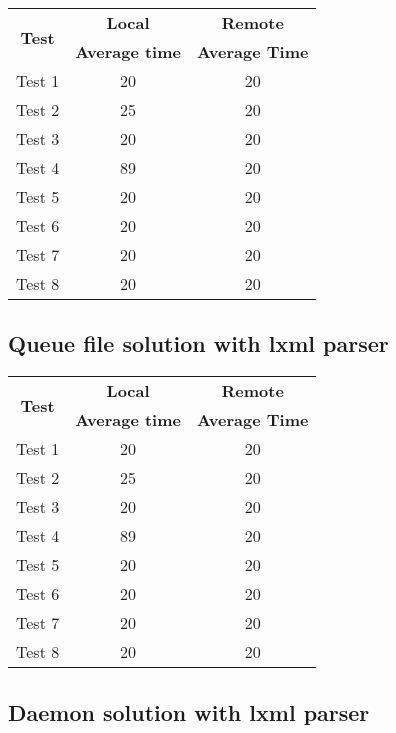 \shorthandoff{-}
\begin{center}
    \begin{tabular}{| c | c | c |}
    \hline
    \multirow{2}{*}{\textbf{Test}} & \textbf{Local} & \textbf{Remote} \\ \cline{2-3}
    & \textbf{Average time} & \textbf{Average Time} \\ \hline
    Test 1 & 20 & 20 \\ \hline
    Test 2 & 25 & 20  \\ \hline
    Test 3 & 20 & 20 \\ \hline
    Test 4 & 89 & 20 \\ \hline
    Test 5 & 20 & 20 \\ \hline
    Test 6 & 20 & 20 \\ \hline
    Test 7 & 20 & 20 \\ \hline
    Test 8 & 20 & 20 \\ \hline
    \end{tabular}
\end{center}
\shorthandon{-}

\subsection{Queue file solution with lxml parser}

\shorthandoff{-}
\begin{center}
    \begin{tabular}{| c | c | c |}
    \hline
    \multirow{2}{*}{\textbf{Test}} & \textbf{Local} & \textbf{Remote} \\ \cline{2-3}
    & \textbf{Average time} & \textbf{Average Time} \\ \hline
    Test 1 & 20 & 20 \\ \hline
    Test 2 & 25 & 20  \\ \hline
    Test 3 & 20 & 20 \\ \hline
    Test 4 & 89 & 20 \\ \hline
    Test 5 & 20 & 20 \\ \hline
    Test 6 & 20 & 20 \\ \hline
    Test 7 & 20 & 20 \\ \hline
    Test 8 & 20 & 20 \\ \hline
    \end{tabular}
\end{center}
\shorthandon{-}

\subsection{Daemon solution with lxml parser}

